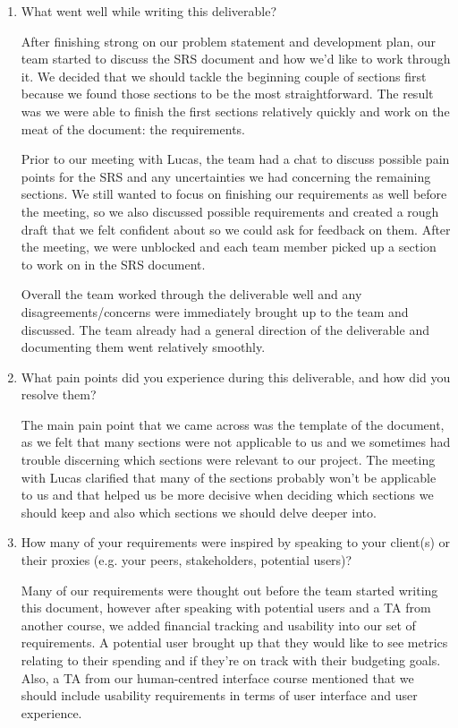 \documentclass[12pt]{article}
\begin{document}
\begin{enumerate}
  \item What went well while writing this deliverable? 

  After finishing strong on our problem statement and development plan, our team started to discuss the SRS document and how we’d like to work through it. We decided that we should tackle the beginning couple of sections first because we found those sections to be the most straightforward. The result was we were able to finish the first sections relatively quickly and work on the meat of the document: the requirements. 

  Prior to our meeting with Lucas, the team had a chat to discuss possible pain points for the SRS and any uncertainties we had concerning the remaining sections. We still wanted to focus on finishing our requirements as well before the meeting, so we also discussed possible requirements and created a rough draft that we felt confident about so we could ask for feedback on them. After the meeting, we were unblocked and each team member picked up a section to work on in the SRS document.

  Overall the team worked through the deliverable well and any disagreements/concerns were immediately brought up to the team and discussed. The team already had a general direction of the deliverable and documenting them went relatively smoothly.  


  \item What pain points did you experience during this deliverable, and how did
  you resolve them?

  The main pain point that we came across was the template of the document, as we felt that many sections were not applicable to us and we sometimes had trouble discerning which sections were relevant to our project. The meeting with Lucas clarified that many of the sections probably won’t be applicable to us and that helped us be more decisive when deciding which sections we should keep and also which sections we should delve deeper into. 

  \item How many of your requirements were inspired by speaking to your
  client(s) or their proxies (e.g. your peers, stakeholders, potential users)?

  Many of our requirements were thought out before the team started writing this document, however after speaking with potential users and a TA from another course, we added financial tracking and usability into our set of requirements. A potential user brought up that they would like to see metrics relating to their spending and if they’re on track with their budgeting goals. Also, a TA from our human-centred interface course mentioned that we should include usability requirements in terms of user interface and user experience.


\end{enumerate}
\end{document}
